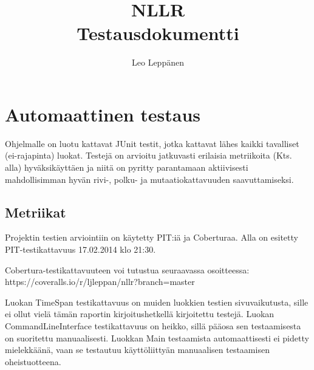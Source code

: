 \documentclass[12pt,a4paper]{article}
\author{Leo Leppänen}
\title{NLLR \\ Testausdokumentti}
\begin{document}
\maketitle

\section{Automaattinen testaus}

Ohjelmalle on luotu kattavat JUnit testit, jotka kattavat lähes kaikki tavalliset (ei-rajapinta) luokat. Testejä on arvioitu jatkuvasti erilaisia metriikoita (Kts. alla) hyväksikäyttäen ja niitä on pyritty parantamaan aktiivisesti mahdollisimman hyvän rivi-, polku- ja mutaatiokattavuuden saavuttamiseksi.

\subsection{Metriikat}
Projektin testien arviointiin on käytetty PIT:iä ja Coberturaa. Alla on esitetty PIT-testikattavuus 17.02.2014 klo 21:30. 

Cobertura-testikattavuuteen voi tutustua seuraavassa osoitteessa: https://coveralls.io/r/ljleppan/nllr?branch=master

Luokan TimeSpan testikattavuus on muiden luokkien testien sivuvaikutusta, sille ei ollut vielä tämän raportin kirjoitushetkellä kirjoitettu testejä. Luokan CommandLineInterface testikattavuus on heikko, sillä pääosa sen testaamisesta on suoritettu manuaalisesti. Luokkan Main testaamista automaattisesti ei pidetty mielekkäänä, vaan se testautuu käyttöliittyän manuaalisen testaamisen oheistuotteena.
\end{document}
